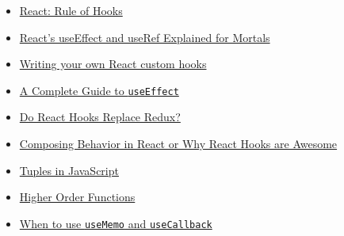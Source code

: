 \begin{itemize}[leftmargin=*]
    \item \href{http://reactjs.org/docs/hooks-rules.html}{React: Rule of Hooks}
    \item \href{https://leewarrick.com/blog/react-use-effect-explained/}{React's useEffect and useRef Explained for Mortals}
    \item \href{https://tvernon.tech/blog/react-custom-hook-for-forms}{Writing your own React custom hooks}
    \item \href{https://overreacted.io/a-complete-guide-to-useeffect/}{A Complete Guide to \texttt{useEffect}}
    \item \href{https://medium.com/javascript-scene/do-react-hooks-replace-redux-210bab340672}{Do React Hooks Replace Redux?}
    \item \href{https://www.youtube.com/watch?v=nUzLlHFVXx0}{Composing Behavior in React or Why React Hooks are Awesome}
    \item \href{https://medium.com/@ntgard/tuples-in-javascript-cd33321e5277}{Tuples in JavaScript}
    \item \href{https://eloquentjavascript.net/05_higher_order.html}{Higher Order Functions}
    \item \href{https://kentcdodds.com/blog/usememo-and-usecallback/}{When to use \texttt{useMemo} and \texttt{useCallback}}
\end{itemize}

